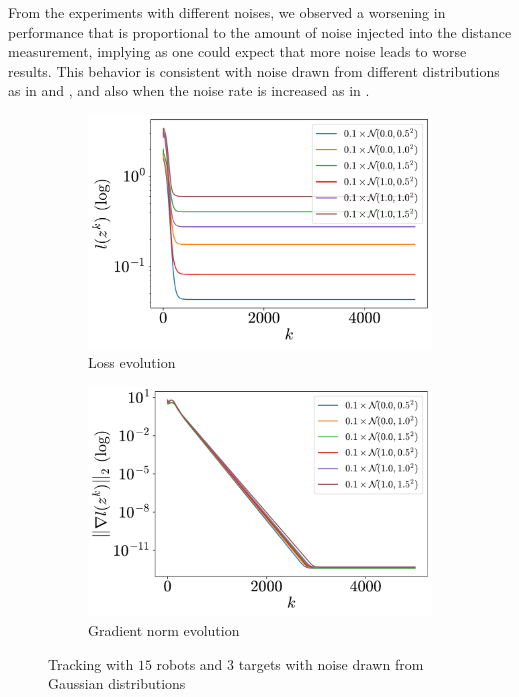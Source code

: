 \documentclass[a4paper,11pt,oneside]{book}
\begin{document}
From the experiments with different noises, we observed a worsening in performance that is proportional to the amount of noise injected into the distance measurement, implying as one could expect that more noise leads to worse results. This behavior is consistent with noise drawn from different distributions as in  and , and also when the noise rate is increased as in .

\begin{figure}[H]
      \centering
      \begin{subfigure}[t]{0.46\linewidth}
            \centering
            \includegraphics[width=\linewidth]{./figs/tracking/gaussian/loss.pdf} 
            \caption{Loss evolution}
      \end{subfigure}
      \hfill
      \begin{subfigure}[t]{0.46\linewidth}
            \centering
            \includegraphics[width=\linewidth]{./figs/tracking/gaussian/gradient.pdf} 
            \caption{Gradient norm evolution}
      \end{subfigure}
      \caption{Tracking with $15$ robots and $3$ targets with noise drawn from Gaussian distributions}
      \label{fig:tracking_gaussian_15_3}
\end{figure}
\end{document}
